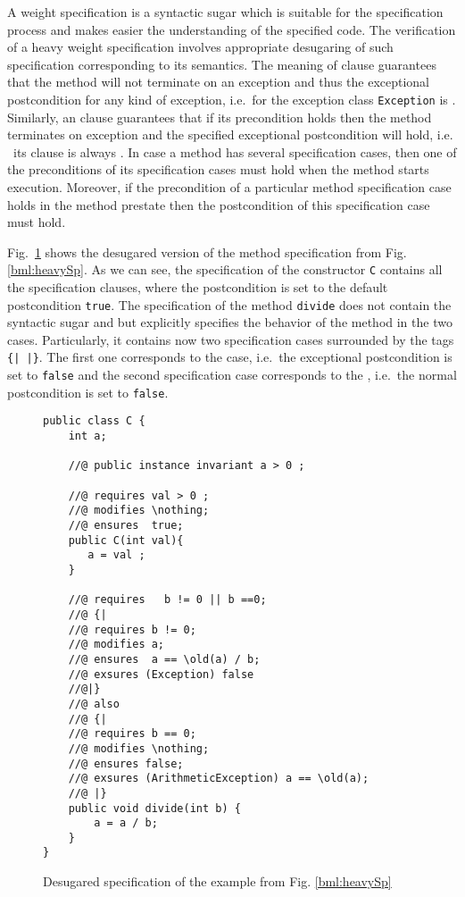 A \heavy{} weight specification is a  syntactic sugar which is suitable for the specification process and  makes easier the understanding
 of the specified code. The verification of  a heavy weight specification involves appropriate desugaring of such specification corresponding to its 
semantics.  
The meaning of   clause guarantees that the method will not terminate on an exception and thus the exceptional postcondition 
for any kind of exception, i.e.\ for the exception class  \texttt{Exception} is  . Similarly, an
  clause guarantees that if its precondition holds then the method terminates on exception and the specified 
exceptional postcondition will hold, i.e. \ its \ensures{} clause is always    . 
In case a method has several specification cases, then one of the  preconditions of its specification cases must hold when the method starts execution. 
Moreover, if the precondition of a particular method specification case holds in the method prestate then the postcondition of this specification case must hold.

Fig.\ \ref{bml:Desugar}  shows  the desugared version of the method specification from  Fig. \ref{bml:heavySp}. As we can see, the specification of the constructor 
\lstinline!C! contains all the specification clauses, where the postcondition is set to the default postcondition \lstinline!true!.
The specification of the method \lstinline!divide! does not contain the syntactic sugar  and
  but explicitly specifies the behavior of the method in the two cases. Particularly, it contains now 
two specification cases surrounded by the tags  \lstinline!{| |}!. The first one corresponds to the 
 case, i.e.\ the exceptional postcondition is set to \lstinline!false! and  the second specification case corresponds to the 
, i.e.\ the normal postcondition is set to  \lstinline!false!.

\begin{figure}
\begin{lstlisting}[frame=trbl]
public class C {
    int a;
    
    //@ public instance invariant a > 0 ;
    
    //@ requires val > 0 ;
    //@ modifies \nothing;
    //@ ensures  true;
    public C(int val){
       a = val ;
    }
   
    //@ requires   b != 0 || b ==0;
    //@ {|
    //@ requires b != 0;
    //@ modifies a;
    //@ ensures  a == \old(a) / b;  
    //@ exsures (Exception) false
    //@|}
    //@ also 
    //@ {|
    //@ requires b == 0;
    //@ modifies \nothing;
    //@ ensures false;
    //@ exsures (ArithmeticException) a == \old(a);
    //@ |}
    public void divide(int b) {
        a = a / b;
    }
}
\end{lstlisting}
\caption{\sc Desugared specification of the example from Fig. \ref{bml:heavySp} } \label{bml:Desugar}
\end{figure}




